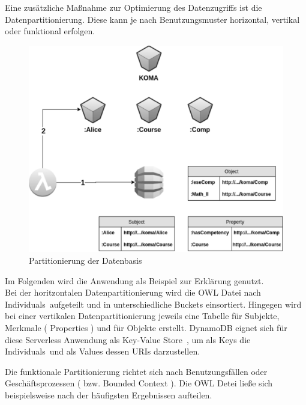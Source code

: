 \documentclass[
12pt,
english,
ngerman,
headsepline,
twoside,
openright,
numbers=noenddot,version=first
]{scrreprt}
\begin{document}
Eine zusätzliche Maßnahme zur Optimierung des Datenzugriffs ist die Datenpartitionierung. Diese kann je nach Benutzungsmuster horizontal, vertikal oder funktional erfolgen.
\begin{figure}[H]
	\begin{center}
		\includegraphics[scale=0.60]{./pics/parititioning.eps}	
		\caption{Partitionierung der Datenbasis}
		\label{pic:partitioning}
	\end{center}
\end{figure}
Im Folgenden wird die Anwendung als Beispiel zur Erklärung genutzt.\\ 
Bei der horitzontalen Datenpartitionierung wird die \acrshort{OWL} Datei nach \glqq Individuals\grqq\ aufgeteilt und in unterschiedliche Buckets einsortiert. Hingegen wird bei einer vertikalen Datenpartitionierung jeweils eine Tabelle für Subjekte, Merkmale ( Properties ) und für Objekte erstellt. DynamoDB eignet sich für diese Serverless Anwendung  als \glqq Key-Value Store\grqq\ , um als Keys die \glqq Individuals\grqq\ und als Values dessen \acrfull{URI}s darzustellen.\cite{ontoVerticalPartition}

Die funktionale Partitionierung richtet sich nach Benutzungsfällen oder Geschäftsprozessen ( bzw. Bounded Context ). Die \acrshort{OWL} Detei ließe sich beispielsweise nach der häufigsten Ergebnissen aufteilen.
\end{document}
